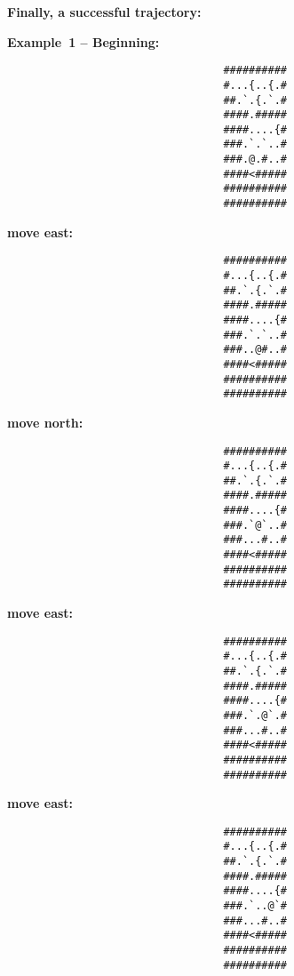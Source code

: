 \begin{MyGreenBox}
{	\textbf{Finally, a successful trajectory:}

	\textbf{Example 1 – Beginning:} \begin{verbatim}
                                  ##########
                                  #...{..{.#
                                  ##.`.{.`.#
                                  ####.#####
                                  ####....{#
                                  ###.`.`..#
                                  ###.@.#..#
                                  ####<#####
                                  ##########
                                  ##########
\end{verbatim}

	\textbf{move east:} \begin{verbatim}
                                  ##########
                                  #...{..{.#
                                  ##.`.{.`.#
                                  ####.#####
                                  ####....{#
                                  ###.`.`..#
                                  ###..@#..#
                                  ####<#####
                                  ##########
                                  ##########
\end{verbatim}

	\textbf{move north:} \begin{verbatim}
                                  ##########
                                  #...{..{.#
                                  ##.`.{.`.#
                                  ####.#####
                                  ####....{#
                                  ###.`@`..#
                                  ###...#..#
                                  ####<#####
                                  ##########
                                  ##########
\end{verbatim}

	\textbf{move east:} \begin{verbatim}
                                  ##########
                                  #...{..{.#
                                  ##.`.{.`.#
                                  ####.#####
                                  ####....{#
                                  ###.`.@`.#
                                  ###...#..#
                                  ####<#####
                                  ##########
                                  ##########
\end{verbatim}

	\textbf{move east:} \begin{verbatim}
                                  ##########
                                  #...{..{.#
                                  ##.`.{.`.#
                                  ####.#####
                                  ####....{#
                                  ###.`..@`#
                                  ###...#..#
                                  ####<#####
                                  ##########
                                  ##########
\end{verbatim}

}
\end{MyGreenBox}
